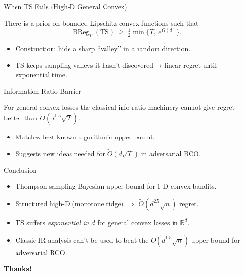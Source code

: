 \documentclass{beamer}
\newcommand{\BReg}{\operatorname{BReg}}
\newcommand{\R}{\mathbb{R}}
\begin{document}
\begin{frame}{When TS Fails (High-D General Convex)}
    \begin{tcolorbox}[title=Lower Bound 1, colback=red!5, colframe=red!60!black]
        There is a prior on bounded Lipschitz convex functions such that
        \[
            \BReg_T(\text{TS}) \;\ge\; \tfrac12\min\!\bigl\{T,\;e^{\Omega(d)}\bigr\}.
        \]
    \end{tcolorbox}

    \smallskip
    \begin{itemize}
        \item Construction: hide a sharp “valley’’ in a random direction.
        \item TS keeps sampling valleys it hasn’t discovered → linear regret until exponential time.
    \end{itemize}
\end{frame}

\begin{frame}{Information-Ratio Barrier}
    \begin{tcolorbox}[title=Lower Bound 2, colback=red!5, colframe=red!60!black]
        For general convex losses the classical info-ratio machinery cannot give regret
        better than \(\widetilde{O}(d^{1.5}\sqrt{T})\).
    \end{tcolorbox}

    \begin{itemize}
        \item Matches best known algorithmic upper bound.
        \item Suggests new ideas needed for \( \widetilde{O}(d\sqrt{T}) \) in adversarial BCO.
    \end{itemize}
\end{frame}

\begin{frame}{Conclusion}
    \begin{itemize}
        \item Thompson sampling Bayesian upper bound for 1-D convex bandits.
        \item Structured high-D (monotone ridge) \(\Rightarrow\) $\tilde{O}(d^{2.5}\sqrt{n})$ regret.
        \item TS suffers \emph{exponential in $d$} for general convex losses in $\R^d$.
        \item Classic IR analysis can't be used to beat the $O(d^{1.5}\sqrt{n})$ upper bound for adversarial BCO.
    \end{itemize}

    \bigskip
    \centering
    \textbf{Thanks!}\\
    \smallskip
\end{frame}

\end{document}
